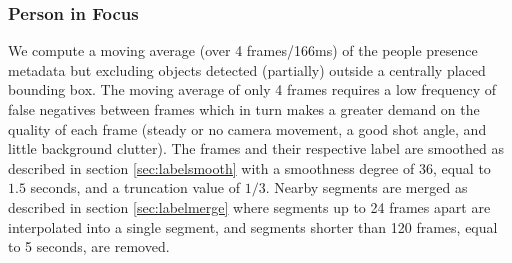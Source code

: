 \subsubsection{Person in Focus}\label{sec:infocus}
%
We compute a moving average (over 4 frames/166ms) of the people presence metadata but excluding objects detected (partially) outside a centrally placed bounding box. The moving average of only 4 frames requires a low frequency of false negatives between frames which in turn makes a greater demand on the quality of each frame (steady or no camera movement, a good shot angle, and little background clutter). The frames and their respective label are smoothed as described in section \ref{sec:labelsmooth} with a smoothness degree of 36, equal to $1.5$ seconds, and a truncation value of $1/3$. Nearby segments are merged as described in section \ref{sec:labelmerge} where segments up to 24 frames apart are interpolated into a single segment, and segments shorter than 120 frames, equal to 5 seconds, are removed.
%
